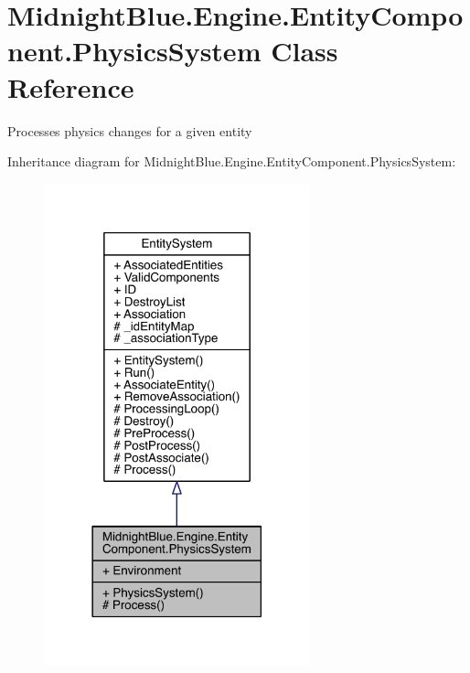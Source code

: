 \hypertarget{class_midnight_blue_1_1_engine_1_1_entity_component_1_1_physics_system}{}\section{Midnight\+Blue.\+Engine.\+Entity\+Component.\+Physics\+System Class Reference}
\label{class_midnight_blue_1_1_engine_1_1_entity_component_1_1_physics_system}


Processes physics changes for a given entity  




Inheritance diagram for Midnight\+Blue.\+Engine.\+Entity\+Component.\+Physics\+System\+:
\nopagebreak
\begin{figure}[H]
\begin{center}
\leavevmode
\includegraphics[width=218pt]{class_midnight_blue_1_1_engine_1_1_entity_component_1_1_physics_system__inherit__graph}
\end{center}
\end{figure}


